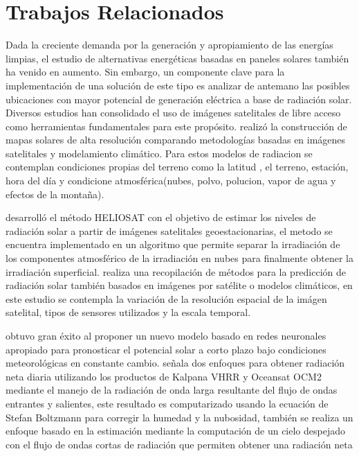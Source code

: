 \section{Trabajos Relacionados}

Dada la creciente demanda por la generación y apropiamiento de las energías limpias, el estudio de alternativas energéticas basadas en paneles 
solares también ha venido en aumento. Sin embargo, un componente clave para la implementación de una solución de este tipo es analizar de antemano 
las posibles ubicaciones con mayor potencial de generación eléctrica a base de radiación solar. Diversos estudios han consolidado el uso de imágenes 
satelitales de libre acceso como herramientas fundamentales para este propósito. \cite{kaku2009creating} realizó la construcción de mapas solares de alta resolución comparando metodologías basadas en imágenes satelitales y modelamiento 
climático. Para estos modelos de radiacion se contemplan condiciones propias del terreno como la latitud , el terreno,
estación, hora del día y condicione atmosférica(nubes, polvo, polucion, vapor de agua y efectos de la montaña).

\cite{hammer2003solarenergy} desarrolló el método HELIOSAT con el 
objetivo de estimar los niveles de radiación solar a partir de imágenes satelitales geoestacionarias, el metodo se encuentra implementado 
en un algoritmo que permite separar la irradiación de los componentes atmosférico de la irradiación en nubes para finalmente obtener la 
irradiación superficial.\cite{diagne2012solarirradiation} realiza una recopilación de métodos para la predicción de radiación solar también basados en imágenes por satélite o modelos climáticos, en este estudio 
se contempla la variación de la resolución espacial de la imágen satelital, tipos de sensores utilizados y la escala temporal.

\cite{wang2012shortterm} obtuvo gran éxito al proponer un nuevo modelo basado en redes neuronales apropiado para pronosticar el potencial solar a corto 
plazo bajo condiciones meteorológicas en constante cambio. \cite{sai2014estimation} señala dos enfoques para obtener radiación neta diaria utilizando los productos de Kalpana VHRR y Oceansat OCM2 mediante el manejo de  la radiación 
de onda larga resultante del flujo de ondas entrantes y salientes, este resultado es computarizado usando la ecuación de Stefan Boltzmann para 
corregir la humedad y la nubosidad,  también se realiza un enfoque basado en la estimación mediante la computación de un cielo despejado con el 
flujo de ondas cortas de radiación que permiten obtener una radiación neta

